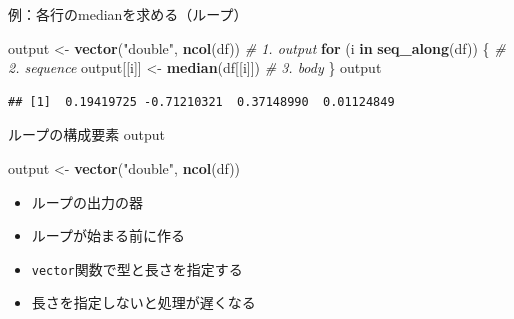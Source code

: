 \documentclass[ignorenonframetext,]{beamer}
\newenvironment{Shaded}{\begin{snugshade}}{\end{snugshade}}
\newcommand{\KeywordTok}[1]{\textcolor[rgb]{0.13,0.29,0.53}{\textbf{#1}}}
\newcommand{\StringTok}[1]{\textcolor[rgb]{0.31,0.60,0.02}{#1}}
\newcommand{\CommentTok}[1]{\textcolor[rgb]{0.56,0.35,0.01}{\textit{#1}}}
\newcommand{\ControlFlowTok}[1]{\textcolor[rgb]{0.13,0.29,0.53}{\textbf{#1}}}
\newcommand{\NormalTok}[1]{#1}
\providecommand{\tightlist}{%
  \setlength{\itemsep}{0pt}\setlength{\parskip}{0pt}}
\begin{document}
\begin{frame}[fragile]{例：各行のmedianを求める（ループ）}

\begin{Shaded}
\begin{Highlighting}[]
\NormalTok{output <-}\StringTok{ }\KeywordTok{vector}\NormalTok{(}\StringTok{"double"}\NormalTok{, }\KeywordTok{ncol}\NormalTok{(df))  }\CommentTok{# 1. output}
\ControlFlowTok{for}\NormalTok{ (i }\ControlFlowTok{in} \KeywordTok{seq_along}\NormalTok{(df)) \{            }\CommentTok{# 2. sequence}
\NormalTok{  output[[i]] <-}\StringTok{ }\KeywordTok{median}\NormalTok{(df[[i]])      }\CommentTok{# 3. body}
\NormalTok{\}}
\NormalTok{output}
\end{Highlighting}
\end{Shaded}

\begin{verbatim}
## [1]  0.19419725 -0.71210321  0.37148990  0.01124849
\end{verbatim}

\end{frame}

\begin{frame}[fragile]{ループの構成要素 output}

\begin{Shaded}
\begin{Highlighting}[]
\NormalTok{output <-}\StringTok{ }\KeywordTok{vector}\NormalTok{(}\StringTok{"double"}\NormalTok{, }\KeywordTok{ncol}\NormalTok{(df))}
\end{Highlighting}
\end{Shaded}

\begin{itemize}
\tightlist
\item
  ループの出力の器
\item
  ループが始まる前に作る
\item
  \texttt{vector}関数で型と長さを指定する
\item
  長さを指定しないと処理が遅くなる
\end{itemize}

\end{frame}
\end{document}
